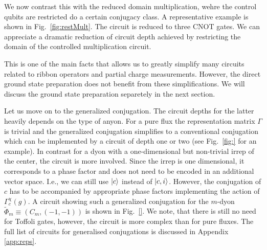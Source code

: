 \documentclass[two column]{article}
\begin{document}
We now contrast this with the reduced domain multiplication, wehre the control qubits are restricted do a certain conjugacy class. A representative example is shown in Fig.~\ref{fig:restMult}. The circuit is reduced to three CNOT gates. We can appreciate a dramatic reduction of circuit depth achieved by restricting the domain of the controlled multiplication circuit.

This is one of the main facts that allows us to greatly simplify many circuits related to ribbon operators and partial charge measurements. However, the direct ground state preparation does not benefit from these simplifications. We will discuss the ground state preparation separetely in the next section.


Let us move on to the generalized conjugation. The circuit depths for the latter heavily depends on the type of anyon. For a pure flux the representation matrix $\Gamma$ is trivial and the generalized conjugation simplifies to a conventional conjugation which can be implemented by a circuit of depth one or two (see Fig.~\ref{fig:} for an example). In contrast for a dyon with a one-dimensional but non-trivial irrep of the center, the circuit is more involved. Since the irrep is one dimensional, it corresponds to a phase factor and does not need to be encoded in an additional vector space. I.e., we can still use $\ket{c}$ instead of $\ket{c,i}$. However, the conjugation of $c$ has to be accompanied by appropriate phase factors implementing the action of $\Gamma^\chi_c(g)$. A circuit showing such a generalized conjugation for the $m$-dyon $\tilde{\Phi}_m \equiv (C_m, (-1, -1))$ is shown in Fig.~\ref{}. We note, that there is still no need for Toffoli gates, however, the circuit is more complex than for pure fluxes. The full list of circuits for generalised conjugations is discussed in Appendix \ref{app:reps}.
\end{document}
